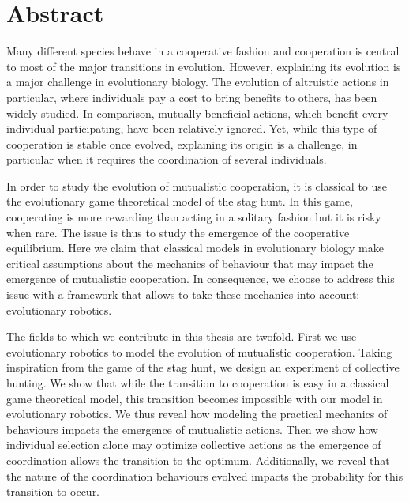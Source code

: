 \newpage
\section*{Abstract}

	Many different species behave in a cooperative fashion and cooperation is central to most of the major transitions in evolution. However, explaining its evolution is a major challenge in evolutionary biology. The evolution of altruistic actions in particular, where individuals pay a cost to bring benefits to others, has been widely studied. In comparison, mutually beneficial actions, which benefit every individual participating, have been relatively ignored. Yet, while this type of cooperation is stable once evolved, explaining its origin is a challenge, in particular when it requires the coordination of several individuals.

	In order to study the evolution of mutualistic cooperation, it is classical to use the evolutionary game theoretical model of the stag hunt. In this game, cooperating is more rewarding than acting in a solitary fashion but it is risky when rare. The issue is thus to study the emergence of the cooperative equilibrium. Here we claim that classical models in evolutionary biology make critical assumptions about the mechanics of behaviour that may impact the emergence of mutualistic cooperation. In consequence, we choose to address this issue with a framework that allows to take these mechanics into account: evolutionary robotics.

	The fields to which we contribute in this thesis are twofold. First we use evolutionary robotics to model the evolution of mutualistic cooperation. Taking inspiration from the game of the stag hunt, we design an experiment of collective hunting. We show that while the transition to cooperation is easy in a classical game theoretical model, this transition becomes impossible with our model in evolutionary robotics. We thus reveal how modeling the practical mechanics of behaviours impacts the emergence of mutualistic actions. Then we show how individual selection alone may optimize collective actions as the emergence of coordination allows the transition to the optimum. Additionally, we reveal that the nature of the coordination behaviours evolved impacts the probability for this transition to occur.


